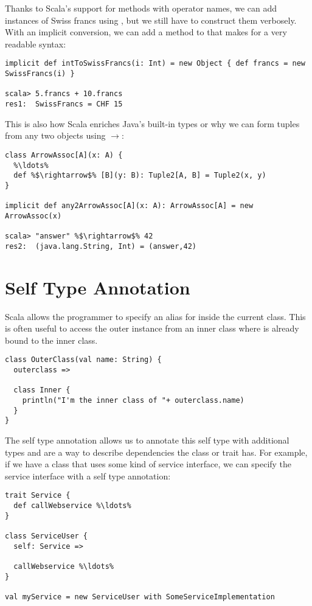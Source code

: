 Thanks to Scala's support for methods with operator names, we can add instances of Swiss francs using \src{+}, but we still have to construct them verbosely. With an implicit conversion, we can add a  method to  that makes for a very readable syntax:

\begin{lstlisting}
implicit def intToSwissFrancs(i: Int) = new Object { def francs = new SwissFrancs(i) }

scala> 5.francs + 10.francs
res1:  SwissFrancs = CHF 15
\end{lstlisting}

This is also how Scala enriches Java's built-in types or why we can form tuples from any two objects using $\rightarrow$:

\begin{lstlisting}
class ArrowAssoc[A](x: A) {
  %\ldots%
  def %$\rightarrow$% [B](y: B): Tuple2[A, B] = Tuple2(x, y)
}

implicit def any2ArrowAssoc[A](x: A): ArrowAssoc[A] = new ArrowAssoc(x)

scala> "answer" %$\rightarrow$% 42
res2:  (java.lang.String, Int) = (answer,42)
\end{lstlisting}

\section{Self Type Annotation} \label{section:self-type-annotation}

Scala allows the programmer to specify an alias for  inside the current class. This is often useful to access the outer instance from an inner class where  is already bound to the inner class. 

\begin{lstlisting}
class OuterClass(val name: String) {
  outerclass =>

  class Inner {
    println("I'm the inner class of "+ outerclass.name)
  }
}
\end{lstlisting}

The self type annotation allows us to annotate this self type with additional types and are a way to describe dependencies the class or trait has. For example, if we have a class that uses some kind of service interface, we can specify the service interface with a self type annotation:

\begin{lstlisting}
trait Service {
  def callWebservice %\ldots%
}

class ServiceUser {
  self: Service =>

  callWebservice %\ldots%
}

val myService = new ServiceUser with SomeServiceImplementation
\end{lstlisting}

